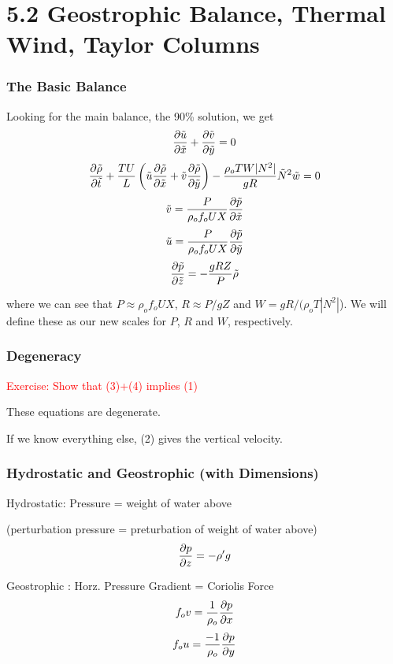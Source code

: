 \documentclass[xcolor=dvipsnames]{beamer}
\begin{document}
\section{5.2 Geostrophic Balance, Thermal Wind, Taylor Columns}

\begin{frame}
\frametitle{The Basic Balance}
Looking for the main balance, the 90\% solution, we get
\begin{equation}
\frac{\partial \tilde u}{\partial \tilde x} + \frac{\partial \tilde v}{\partial \tilde y} = 0
\end{equation}
\begin{equation}
\frac{\partial \tilde \rho}{\partial \tilde t} + \frac{TU}{L} \left( \tilde u \frac{\partial \tilde \rho}{\partial \tilde x} +\tilde v \frac{\partial \tilde \rho}{\partial \tilde y} \right) - \frac{\rho_o TW |N^2|}{gR} \tilde N^2  \tilde w =0
\end{equation}
\begin{equation}
\tilde v = \frac{P}{\rho_o f_o UX} \frac{\partial \tilde p}{\partial \tilde x}
\end{equation}
\begin{equation}
\tilde u = \frac{P}{\rho_o f_o UX} \frac{\partial \tilde p}{\partial \tilde y}
\end{equation}
\begin{equation}
\frac{\partial \tilde p}{\partial \tilde z} = -\frac{gRZ}{P} \tilde \rho 
\end{equation}

where we can see that $P \approx \rho_o f_o UX$, $R \approx P/gZ$ and $W = gR/(\rho_o T |N^2|$).  We will define these as our new scales for $P$, $R$ and $W$, respectively.

\end{frame}

\begin{frame}
\frametitle{Degeneracy}

\textcolor{red}{Exercise: Show that (3)+(4) implies (1)}

These equations are degenerate. 

If we know everything else, (2) gives the vertical velocity.
\end{frame}

\begin{frame}
\frametitle{Hydrostatic and Geostrophic (with Dimensions)}

Hydrostatic: Pressure = weight of water above

(perturbation pressure = preturbation of weight of water above)
\[ \frac {\partial p}{\partial z} = - \rho^\prime g \]

Geostrophic : Horz. Pressure Gradient = Coriolis Force
\[ f_o v = \frac{1}{\rho_o} \frac {\partial p}{\partial x} \]
\[ f_o u = \frac{-1}{\rho_o} \frac {\partial p}{\partial y} \]
\end{frame}
\end{document}
